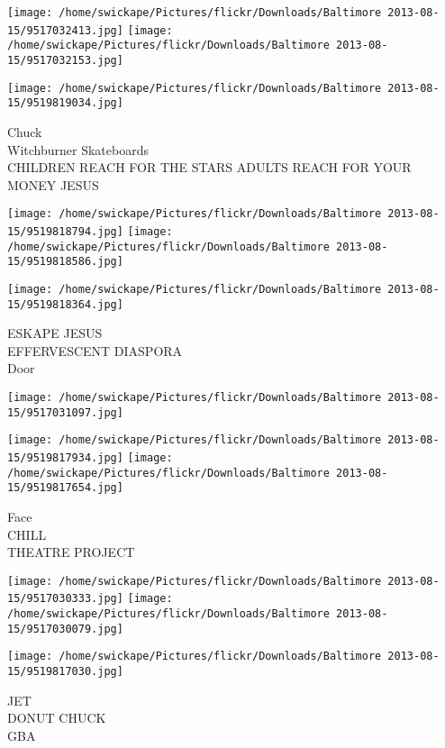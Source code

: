 \documentclass[10pt,letterpaper]{article}
\begin{document}
\texttt{[image: /home/swickape/Pictures/flickr/Downloads/Baltimore 2013-08-15/9517032413.jpg]}
\texttt{[image: /home/swickape/Pictures/flickr/Downloads/Baltimore 2013-08-15/9517032153.jpg]}

\vspace{0.25in}
\texttt{[image: /home/swickape/Pictures/flickr/Downloads/Baltimore 2013-08-15/9519819034.jpg]}

Chuck\\
Witchburner Skateboards\\
CHILDREN REACH FOR THE STARS ADULTS REACH FOR YOUR MONEY JESUS\\
\pagebreak

\texttt{[image: /home/swickape/Pictures/flickr/Downloads/Baltimore 2013-08-15/9519818794.jpg]}
\texttt{[image: /home/swickape/Pictures/flickr/Downloads/Baltimore 2013-08-15/9519818586.jpg]}

\texttt{[image: /home/swickape/Pictures/flickr/Downloads/Baltimore 2013-08-15/9519818364.jpg]}

ESKAPE JESUS\\
EFFERVESCENT DIASPORA\\
Door\\
\pagebreak

\texttt{[image: /home/swickape/Pictures/flickr/Downloads/Baltimore 2013-08-15/9517031097.jpg]}

\vspace{0.25in}
\texttt{[image: /home/swickape/Pictures/flickr/Downloads/Baltimore 2013-08-15/9519817934.jpg]}
\texttt{[image: /home/swickape/Pictures/flickr/Downloads/Baltimore 2013-08-15/9519817654.jpg]}

Face\\
CHILL\\
THEATRE PROJECT\\
\pagebreak

\texttt{[image: /home/swickape/Pictures/flickr/Downloads/Baltimore 2013-08-15/9517030333.jpg]}
\texttt{[image: /home/swickape/Pictures/flickr/Downloads/Baltimore 2013-08-15/9517030079.jpg]}

\texttt{[image: /home/swickape/Pictures/flickr/Downloads/Baltimore 2013-08-15/9519817030.jpg]}

JET\\
DONUT CHUCK\\
GBA\\
\pagebreak
\end{document}
